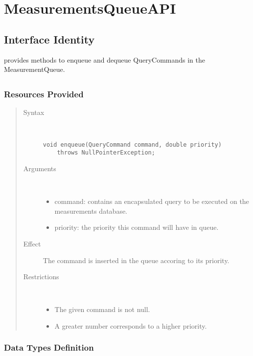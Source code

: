 \section{MeasurementsQueueAPI}
\label{api:measurements-queue-api}

\subsection{Interface Identity}

\npar {} provides methods to enqueue and dequeue
QueryCommands in the MeasurementQueue.

\subsection{}

\subsubsection{Resources Provided}

\begin{quote}
	\begin{description}
		\item[Syntax] \ 
		\begin{verbatim}
void enqueue(QueryCommand command, double priority) 
    throws NullPointerException;
		\end{verbatim}
		\item[Arguments] \
		\begin{itemize}
			\item command: contains an encapsulated query to be executed on the
			measurements database.
			\item priority: the priority this command will have in queue. 
		\end{itemize}
		\item[Effect] The command is inserted in the queue accoring to its priority.
		\item[Restrictions] \ 
		\begin{itemize}
			\item The given command is not null.
			\item A greater number corresponds to a higher priority. 
		\end{itemize}
	\end{description} 
\end{quote}

\subsubsection{Data Types Definition}

